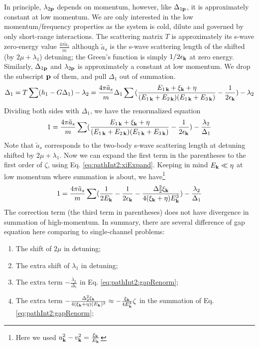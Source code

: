 In principle, $\lambda_{2\mathbf{p}}$ depends on momentum, however, like $\Delta_{1\mathbf{p}}$, it is approximately constant at low momentum.
We are only interested in the low momentum/frequency properties as the system is cold, dilute and governed by only short-range interactions. The scattering matrix $T$ is approximately its s-wave zero-energy value $\frac{4\pi{\tilde{a}_{s}}}{m}$ although $\tilde{a}_{s}$ is the s-wave scattering length of the shifted (by $2\mu+\lambda_{1}$) detuning; the Green's function is simply $1/2\epsilon_{\mathbf{k}}$ at zero energy.   Similarly,   $\Delta_{1\mathbf{p}}$ and $\lambda_{2\mathbf{p}}$ is approximately a constant at low momentum.  We drop the subscript $\mathbf{p}$ of them, and pull $\Delta_{1}$ out of summation. 
\begin{equation}
\Delta_{1}=T\sum(h_{1}-G\Delta_{1})-\lambda_{2}
=\frac{4\pi{\tilde{a}_{s}}}{m}\Delta_{1}\sum{}(\frac{E_{1\,\mathbf{k}}+\xi_{\mathbf{k}}+\eta}{(E_{1\,\mathbf{k}}+E_{2\,\mathbf{k}})(E_{1\,\mathbf{k}}+E_{3\,\mathbf{k}})}-\frac{1}{2\epsilon_{\mathbf{k}}})
	-\lambda_{2}
\end{equation}
Dividing both sides with $\Delta_{1}$, we have the renormalized equation
\begin{equation}
1=\frac{4\pi{\tilde{a}_{s}}}{m}\sum(\frac{E_{1\,\mathbf{k}}+\xi_{\mathbf{k}}+\eta}{(E_{1\,\mathbf{k}}+E_{2\,\mathbf{k}})(E_{1\,\mathbf{k}}+E_{3\,\mathbf{k}})}-\frac{1}{2\epsilon_{\mathbf{k}}})
	-\frac{\lambda_{2}}{\Delta_{1}}
\end{equation}
Note that $\tilde{a}_{s}$ corresponds to the two-body s-wave scattering length at detuning shifted by $2\mu+\lambda_{1}$.
Now we can expand the first term in the parentheses to the first order of $\zeta$, using Eq. \ref{eq:pathInt2:xiExpand}. Keeping in mind $E_{\mathbf{k}}\ll{\eta}$ at low momentum where summation is about, we have\footnote{Here we used $u_{\mathbf{k}}^{2}-v_{\mathbf{k}}^{2}=\frac{\xi_{\mathbf{k}}}{E_{\mathbf{k}}}$}
\begin{equation}\label{eq:pathInt2:gapRenorm}
1=\frac{4\pi{\tilde{a}_{s}}}{m}\sum(\frac{1}{2E_{\mathbf{k}}}-\frac{1}{2\epsilon_{\mathbf{k}}}-\frac{\Delta_{2}^{2}\xi_{\mathbf{k}}}{4(\xi_{\mathbf{k}}+\eta){E_{\mathbf{k}}^{3}}})
	-\frac{\lambda_{2}}{\Delta_{1}}
\end{equation}
The correction term (the third term in parentheses) does not have divergence in summation of high-momentum. 
In summary, there are several difference of gap equation here comparing to single-channel problems:
\begin{enumerate}
\item\label{item:pathInt2:mu}The shift of $2\mu$ in detuning;
\item The extra shift of $\lambda_{1}$ in detuning;
\item The extra term $-\frac{\lambda_{2}}{\Delta_{1}}$ in Eq. \ref{eq:pathInt2:gapRenorm};
\item The extra term $-\frac{\Delta_{2}^{2}\xi_{\mathbf{k}}}{4(\xi_{\mathbf{k}}+\eta){(E_{\mathbf{k}})^{3}}}\approx-\frac{\xi_{\mathbf{k}}}{4{E_{\mathbf{k}}^{3}}}\zeta$ in the summation of Eq. \ref{eq:pathInt2:gapRenorm};
\end{enumerate}
